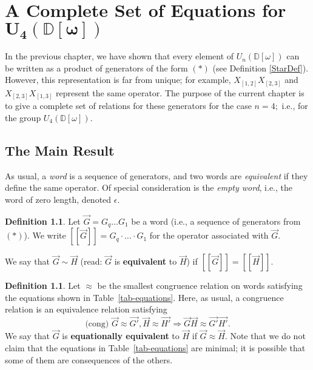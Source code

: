 \documentclass{dalthesis}
\theoremstyle{theorem}
\theoremstyle{definition}
\newtheorem{definition}[theorem]{Definition}
\theoremstyle{definition}  %
\theoremstyle{definition}
\newcommand{\D}{\mathbb{D}}
\newcommand{\sem}[1]{[\![#1]\!]}
\renewcommand{\:}{\mathbin{:}}
\renewcommand{\vec}{\overrightarrow}
\begin{document}
\chapter{A Complete Set of Equations for \texorpdfstring{$\boldsymbol{U_4(\D[\omega])}$}{U^^e2^^82^^84(^^e2^^85^^85[^^cf^^89])}}

In the previous chapter, we have shown that every element of $U_n(\D[\omega])$ can be written as a product of generators of the form $(*)$ (see Definition \ref{StarDef}). However, this representation is far from unique; for example, $X_{[1,2]}X_{[2,3]}$ and $X_{[2,3]}X_{[1,3]}$ represent the same operator. The purpose of the current chapter is to give a complete set of relations for these generators for the case $n=4;$ i.e., for the group $U_4(\D[\omega])$.

\section{The Main Result}

As usual, a \textit{word} is a sequence of generators, and two words are \textit{equivalent} if they define the same operator. Of special consideration is the \textit{empty word}, i.e., the word of zero length, denoted $\epsilon.$

\begin{definition}
\label{Equiv1Def}
Let $\vec{G} = G_q\ldots G_1$ be a word (i.e., a sequence of generators from $(*)$). We write $\sem{\vec{G}} = G_q\cdot\ldots \cdot G_1$ for the operator associated with $\vec{G}.$

We say that $\overrightarrow{G}\sim\overrightarrow{H}$ (read: $\overrightarrow{G}$ is \textbf{equivalent} to $\overrightarrow{H}$) if $\sem{\vec{G}} = \sem{\vec{H}}.$
\end{definition}

\begin{definition}
\label{Equiv2Def}
Let $\approx$ be the smallest congruence relation on words satisfying the equations shown in
Table~\ref{tab-equations}.
Here, as usual, a congruence relation is an equivalence relation satisfying \[
\mbox{(cong) }\vec{G}\approx\vec{G'},\vec{H}\approx\vec{H'}\Rightarrow\vec{G}\vec{H}\approx\vec{G'}\vec{H'}.
\]
We say that $\overrightarrow{G}$ is \textbf{equationally equivalent} to $\overrightarrow{H}$ if $\overrightarrow{G}\approx\overrightarrow{H}.$
Note that we do not claim that the equations in Table~\ref{tab-equations} are minimal; it is possible that some of them are consequences of the others.
\end{definition}
\end{document}
